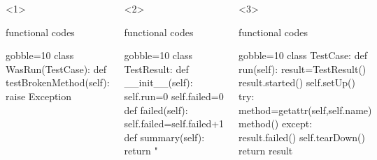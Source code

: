 \documentclass[lualatex]{beamer}
\begin{document}
\begin{frame}[fragile,t]
\begin{columns}[t]
    \begin{onlyenv}<1>
      \begin{block}{functional codes}
        \begin{pythoncode*}{gobble=10}
          class WasRun(TestCase):
            def testBrokenMethod(self):
              raise Exception
        \end{pythoncode*}
      \end{block}
    \end{onlyenv}
    \begin{onlyenv}<2>
      \begin{block}{functional codes}
        \begin{pythoncode*}{gobble=10}
          class TestResult:
            def __init__(self):
              self.run=0
              self.failed=0
            def failed(self):
              self.failed=self.failed+1
            def summary(self):
              return "%
        \end{pythoncode*}
      \end{block}
    \end{onlyenv}
    \begin{onlyenv}<3>
      \begin{block}{functional codes}
        \begin{pythoncode*}{gobble=10}
          class TestCase:
            def run(self):
              result=TestResult()
              result.started()
              self.setUp()
              try:
                method=getattr(self,self.name)
                method()
              except:
                result.failed()
              self.tearDown()
              return result
        \end{pythoncode*}
      \end{block}
    \end{onlyenv}
  \end{columns}

\end{frame}
\end{document}
